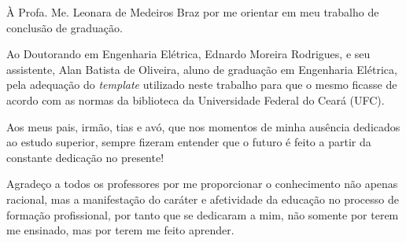 
À Profa. Me. Leonara de Medeiros Braz por me orientar em meu trabalho de conclusão
de graduação.

Ao Doutorando em Engenharia Elétrica, Ednardo Moreira Rodrigues, e seu
assistente, Alan Batista de Oliveira, aluno de graduação em Engenharia
Elétrica, pela adequação do \textit{template} utilizado neste trabalho para que
o mesmo ficasse de acordo com as normas da biblioteca da Universidade Federal
do Ceará (UFC).

Aos meus pais, irmão, tias e avó, que nos momentos de minha ausência dedicados
ao estudo superior, sempre fizeram entender que o futuro é feito a partir da
constante dedicação no presente!

Agradeço a todos os professores por me proporcionar o conhecimento não apenas
racional, mas a manifestação do caráter e afetividade da educação no processo
de formação profissional, por tanto que se dedicaram a mim, não somente por
terem me ensinado, mas por terem me feito aprender.